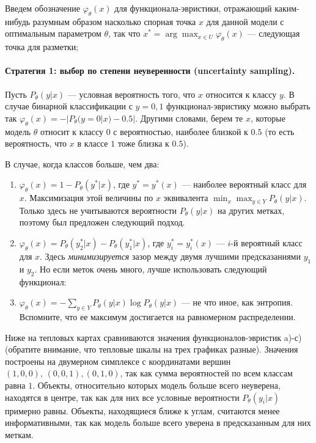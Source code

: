 \documentclass[specialist, 12pt, href]{article}
\begin{document}
Введем обозначение \(\varphi_{\theta}(x)\) для функционала-эвристики, отражающий каким-нибудь разумным образом насколько спорная точка $x$ для данной модели с оптимальным параметром $\theta$, так что
\(x^* = \arg\max_{x \in U} \varphi_{\theta}(x)\) --- следующая точка для
разметки;

\paragraph{Стратегия 1: выбор по степени неуверенности (uncertainty
sampling).}

Пусть \(P_{\theta}(y|x)\) --- условная вероятность того, что \(x\)
относится к классу \(y\). В случае бинарной классификации с \(y = 0, 1\)
функционал-эвристику можно выбрать так
\(\varphi_{\theta}(x) = -|P_{\theta}(y = 0|x) - 0.5|\). Другими словами,
берем те \(x\), которые модель \(\theta\) относит к классу \(0\) с
вероятностью, наиболее близкой к \(0.5\) (то есть вероятность, что \(x\)
в классе \(1\) тоже близка к \(0.5\)).

В случае, когда классов больше, чем два:

\begin{enumerate}
\def\labelenumi{\alph{enumi})}
\item
  \(\varphi_{\theta}(x) = 1 - P_{\theta}(y^*|x)\), где \(y^* = y^*(x)\)
  --- наиболее вероятный класс для \(x\). Максимизация этой величины по
  \(x\) эквивалента \(\min_x\max_{y\in Y} P_{\theta}(y|x)\). Только
  здесь не учитываются вероятности \(P_{\theta}(y|x)\) на других метках,
  поэтому был предложен следующий подход.
\item
  \(\varphi_{\theta}(x) = P_{\theta}(y^*_2|x) - P_{\theta}(y^*_1|x)\),
  где \(y^*_i = y^*_i(x)\) --- \(i\)-й вероятный класс для \(x\). Здесь
  \emph{минимизируется} зазор между двумя лучшими предсказаниями \(y_1\)
  и \(y_2\). Но если меток очень много, лучше использовать следующий
  функционал:
\item
  \(\varphi_{\theta}(x) = - \sum_{y \in Y} P_{\theta}(y|x) \log P_{\theta}(y|x)\)
  --- не что иное, как энтропия. Вспомните, что ее максимум достигается
  на равномерном распределении.
\end{enumerate}

Ниже на тепловых картах сравниваются значения функционалов-эвристик
a)-с) (обратите внимание, что тепловые шкалы на трех графиках разные). Значения построены на двумерном симплексе с координатами вершин \((1, 0, 0),\, (0, 0, 1), (0, 1, 0)\), так как сумма вероятностей по всем классам равна \(1\).
Объекты, относительно которых модель больше всего неуверена, находятся в
центре, так как для них все условные вероятности
\(P_{\theta}(y_i|x)\) примерно равны. Объекты, находящиеся ближе к
углам, считаются менее информативными, так как модель больше всего
уверена в предсказанным для них меткам.
\end{document}
